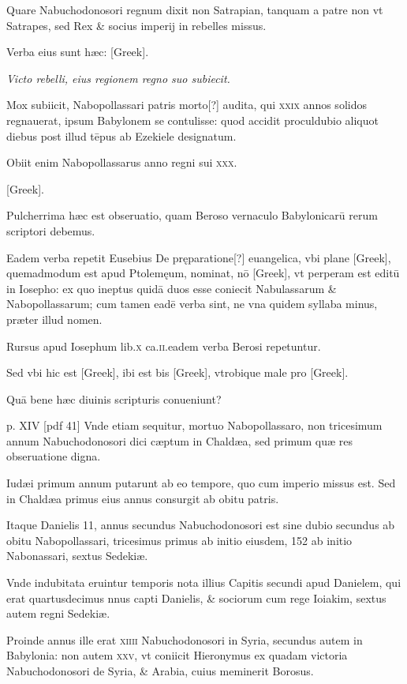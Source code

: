 \begin{parnumbers}
Quare Nabuchodonosori regnum
dixit non Satrapian, tanquam a patre non vt Satrapes, sed Rex
\& socius imperij in rebelles missus.

Verba eius sunt hæc: \textgreek{[Greek]}.

\textit{Victo rebelli, eius regionem regno suo subiecit.}

Mox subiicit, Nabopollassari patris morto[?]
audita, qui \textsc{xxix} annos solidos regnauerat, ipsum Babylonem se
contulisse: quod accidit proculdubio aliquot diebus post illud tēpus
ab Ezekiele designatum.

Obiit enim Nabopollassarus anno regni
sui \textsc{xxx}.

\textgreek{[Greek]}.

Pulcherrima hæc est obseruatio, quam Beroso vernaculo
Babylonicarū rerum scriptori debemus.

Eadem verba repetit Eusebius De pręparatione[?] euangelica, vbi plane \textgreek{[Greek]}, quemadmodum
est apud Ptolemęum, nominat, nō \textgreek{[Greek]}, vt perperam
est editū in Iosepho: ex quo ineptus quidā duos esse coniecit
Nabulassarum \& Nabopollassarum; cum tamen eadē verba sint, ne
vna quidem syllaba minus, præter illud nomen.

Rursus apud Iosephum
lib.\textsc{x} ca.\textsc{ii}.eadem verba Berosi repetuntur.

Sed vbi hic est \textgreek{[Greek]},
ibi est bis \textgreek{[Greek]}, vtrobique male pro \textgreek{[Greek]}.

Quā bene hæc diuinis scripturis conueniunt?

\clearpage
p. XIV [pdf 41]
Vnde etiam sequitur, mortuo Nabopollassaro, non tricesimum annum Nabuchodonosori
dici cæptum in Chaldæa, sed primum quæ res obseruatione
digna.

Iudæi primum annum putarunt ab eo tempore, quo
cum imperio missus est. Sed in Chaldæa primus eius annus consurgit
ab obitu patris.

Itaque Danielis 11, annus secundus Nabuchodonosori
est sine dubio secundus ab obitu Nabopollassari, tricesimus
primus ab initio eiusdem, 152 ab initio Nabonassari, sextus
Sedekiæ.

Vnde indubitata eruintur temporis nota illius Capitis secundi
apud Danielem, qui erat quartusdecimus nnus capti Danielis,
\& sociorum cum rege Ioiakim, sextus autem regni Sedekiæ.

Proinde annus ille erat \textsc{xiiii} Nabuchodonosori in Syria, secundus
autem in Babylonia: non autem \textsc{xxv}, vt coniicit Hieronymus
ex quadam victoria Nabuchodonosori de Syria, \& Arabia, cuius
meminerit Borosus.


\end{parnumbers}
